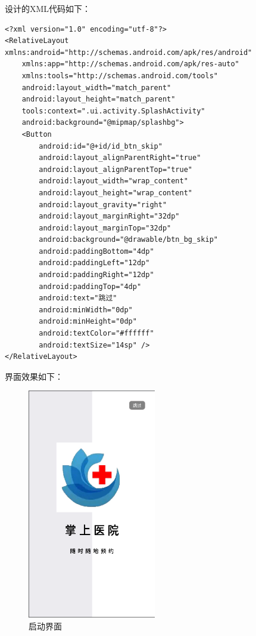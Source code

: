 \documentclass[UTF8,12pt]{article}
\begin{document}
设计的XML代码如下：

\begin{lstlisting}
<?xml version="1.0" encoding="utf-8"?>
<RelativeLayout xmlns:android="http://schemas.android.com/apk/res/android"
    xmlns:app="http://schemas.android.com/apk/res-auto"
    xmlns:tools="http://schemas.android.com/tools"
    android:layout_width="match_parent"
    android:layout_height="match_parent"
    tools:context=".ui.activity.SplashActivity"
    android:background="@mipmap/splashbg">
    <Button
        android:id="@+id/id_btn_skip"
        android:layout_alignParentRight="true"
        android:layout_alignParentTop="true"
        android:layout_width="wrap_content"
        android:layout_height="wrap_content"
        android:layout_gravity="right"
        android:layout_marginRight="32dp"
        android:layout_marginTop="32dp"
        android:background="@drawable/btn_bg_skip"
        android:paddingBottom="4dp"
        android:paddingLeft="12dp"
        android:paddingRight="12dp"
        android:paddingTop="4dp"
        android:text="跳过"
        android:minWidth="0dp"
        android:minHeight="0dp"
        android:textColor="#ffffff"
        android:textSize="14sp" />
</RelativeLayout>
\end{lstlisting}

界面效果如下：

\begin{figure}[htbp]
    \centering
    \includegraphics[width=0.5\textwidth]{imgs/2.png}
    \caption{启动界面}
    \label{fig:splash}
\end{figure}
\end{document}

